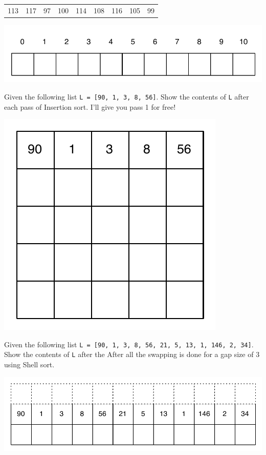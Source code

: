\documentclass[11pt]{exam}
\begin{document}
\begin{questions}
\begin{table}[h!]
    \begin{center}
    \begin{tabular}{|c|c|c|c|c|c|c|c|c|}
    113 & 117 & 97 & 100 & 114 & 108 & 116 & 105 & 99 \\
     \end{tabular}
     \includegraphics{hash_table_11}
    \end{center}
    \label{htab}
\end{table}


\question[10] Given the following list \lstinline{L = [90, 1, 3, 8, 56]}.  Show the contents of \lstinline{L} after each pass of Insertion sort.  I'll give you pass 1 for free!
\begin{center}
\includegraphics{insertion_boxes}
\end{center}



\question[10] Given the following list \lstinline{L = [90, 1, 3, 8, 56, 21, 5, 13, 1, 146, 2, 34]}.  Show the contents of \lstinline{L} after the After all the swapping is done for a gap size of 3 using Shell sort.

\begin{center}
\includegraphics{shell_gaps}
\end{center}


\end{questions}
\end{document}
